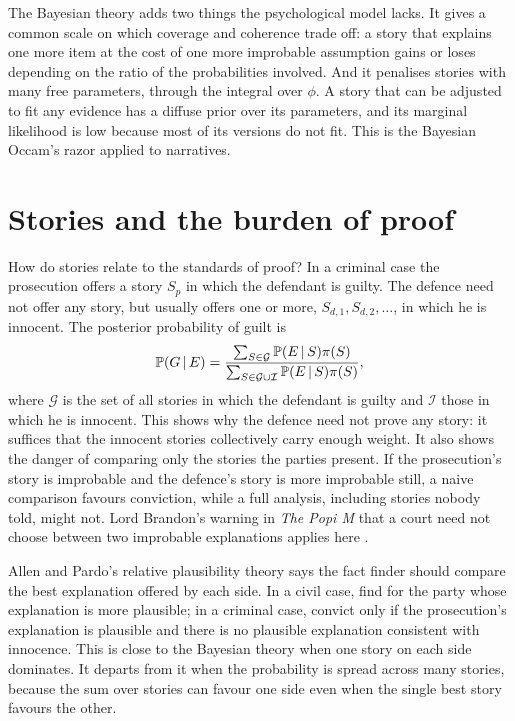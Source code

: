 The Bayesian theory adds two things the psychological model lacks. It gives a common scale on which coverage and coherence trade off: a story that explains one more item at the cost of one more improbable assumption gains or loses depending on the ratio of the probabilities involved. And it penalises stories with many free parameters, through the integral over $\phi$. A story that can be adjusted to fit any evidence has a diffuse prior over its parameters, and its marginal likelihood is low because most of its versions do not fit. This is the Bayesian Occam's razor applied to narratives.

\section{Stories and the burden of proof}

How do stories relate to the standards of proof? In a criminal case the prosecution offers a story $S_p$ in which the defendant is guilty. The defence need not offer any story, but usually offers one or more, $S_{d,1}, S_{d,2},\ldots$, in which he is innocent. The posterior probability of guilt is
\begin{equation}
\mathbb{P}(G\,\vert\, E) = \frac{\sum_{S \in \mathcal{G}} \mathbb{P}(E\,\vert\, S)\pi(S)}{\sum_{S\in \mathcal{G}\cup\mathcal{I}} \mathbb{P}(E\,\vert\, S)\pi(S)},
\end{equation}
where $\mathcal{G}$ is the set of all stories in which the defendant is guilty and $\mathcal{I}$ those in which he is innocent. This shows why the defence need not prove any story: it suffices that the innocent stories collectively carry enough weight. It also shows the danger of comparing only the stories the parties present. If the prosecution's story is improbable and the defence's story is more improbable still, a naive comparison favours conviction, while a full analysis, including stories nobody told, might not. Lord Brandon's warning in \emph{The Popi M} that a court need not choose between two improbable explanations applies here \citep{popim1985}.

Allen and Pardo's relative plausibility theory says the fact finder should compare the best explanation offered by each side. In a civil case, find for the party whose explanation is more plausible; in a criminal case, convict only if the prosecution's explanation is plausible and there is no plausible explanation consistent with innocence. This is close to the Bayesian theory when one story on each side dominates. It departs from it when the probability is spread across many stories, because the sum over stories can favour one side even when the single best story favours the other.

